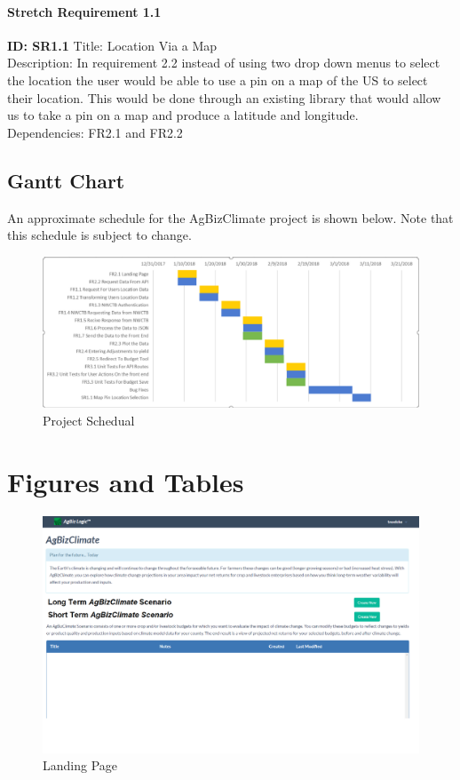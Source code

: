 \documentclass[onecolumn, draftclsnofoot,10pt, compsoc]{article}
\begin{document}
					\paragraph{Stretch Requirement 1.1}
						\textbf{ID: SR1.1}\hfill \break
						Title: Location Via a Map\\
						Description: In requirement 2.2 instead of using two drop down menus to select the location the user would be able to use a pin on a map of the US to select their location. This would be done through an existing library that would allow us to take a pin on a map and produce a latitude and longitude.\\
						Dependencies: FR2.1 and FR2.2\\
\begin{landscape}
	\section{Gantt Chart}
		An approximate schedule for the AgBizClimate project is shown below. Note that this schedule is subject to change.
	
		\begin{figure} [h]
			\includegraphics[width =\linewidth]{Figures/GanttChart.eps}
			\caption{Project Schedual}
			\label{fig:Gantt}
		\end{figure}
\end{landscape}


\section{Figures and Tables} \label{ref:FigTab}

	\begin{figure}[h]
		\includegraphics[width=\linewidth]{Figures/LandingPage.eps}
		\caption{Landing Page}
		\label{figure3.1}
	\end{figure}
					
\end{document}
